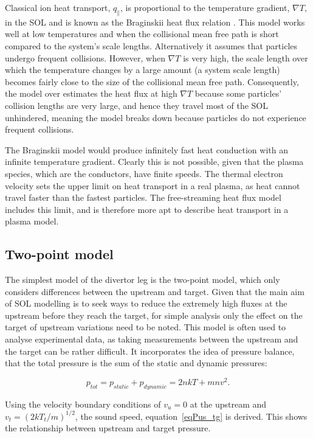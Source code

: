 \documentclass[12pt]{article}  %
\newcommand{\citep}[1]{\cite{#1}}
\begin{document}
Classical ion heat transport, $q_{\parallel}$, is proportional to the temperature gradient, $\nabla T$, in the SOL and is known as the Braginskii heat flux relation \citep{Braginskii1965}. This model works well at low temperatures and when the collisional mean free path is short compared to the system's scale lengths. Alternatively it assumes that particles undergo frequent collisions. However, when $\nabla T$ is very high, the scale length over which the temperature changes by a large amount (a system scale length) becomes fairly close to the size of the collisional mean free path. Consequently, the model over estimates the heat flux at high $\nabla T$ because some particles' collision lengths are very large, and hence they travel most of the SOL unhindered, meaning the model breaks down because particles do not experience frequent collisions.

The Braginskii model would produce infinitely fast heat conduction with an infinite temperature gradient. Clearly this is not possible, given that the plasma species, which are the conductors, have finite speeds. The thermal electron velocity sets the upper limit on heat transport in a real plasma, as heat cannot travel faster than the fastest particles. The free-streaming heat flux model includes this limit, and is therefore more apt to describe heat transport in a plasma model.

\subsection{Two-point model}\label{ssec2PT}
The simplest model of the divertor leg is the two-point model, which only considers differences between the upstream and target. Given that the main aim of SOL modelling is to seek ways to reduce the extremely high fluxes at the upstream before they reach the target, for simple analysis only the effect on the target of upstream variations need to be noted. This model is often used to analyse experimental data, as taking measurements between the upstream and the target can be rather difficult. It incorporates the idea of pressure balance, that the total pressure is the sum of the static and dynamic pressures:

  \begin{equation}\label{eqPbal}
  p_{tot} = p_{static} + p_{dynamic} = 2nkT + mnv^2.
  \end{equation}

Using the velocity boundary conditions of $ v_u=0 $ at the upstream and $ v_t=(2kT_t/m)^{1/2} $, the sound speed, equation~\ref{eqPus_tg} is derived. This shows the relationship between upstream and target pressure.
\end{document}
